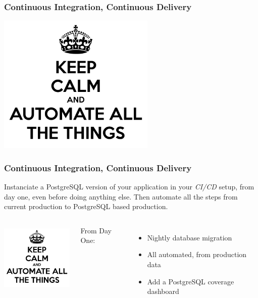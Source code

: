 \documentclass{beamer}
\begin{document}
\begin{frame}[fragile]
  \frametitle{Continuous Integration, Continuous Delivery}

  \begin{center}
    \includegraphics[height=18em]{keep-calm-and-automate-all-the-things-13.png}
  \end{center}  
\end{frame}

\begin{frame}[fragile]
  \frametitle{Continuous Integration, Continuous Delivery}

  Instanciate a PostgreSQL version of your application in your
  \textit{CI/CD} setup, from day one, even before doing anything else. Then
  automate all the steps from current production to PostgreSQL based
  production.

  \vfill
  
  \begin{columns}[c]
    \begin{center}
      \includegraphics[height=9em]{keep-calm-and-automate-all-the-things-13.png}
    \end{center}

    From Day One:
    \begin{itemize}
    \item Nightly database migration
    \item All automated, from production data
    \item Add a PostgreSQL coverage dashboard
    \end{itemize}
  \end{columns}
\end{frame}
\end{document}
